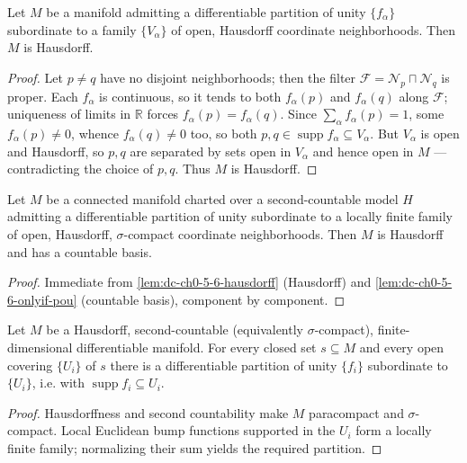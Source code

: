 \begin{lemma}
  \label{lem:dc-ch0-5-6-hausdorff}
  \leanok
  Let $M$ be a manifold admitting a differentiable partition of unity $\{f_\alpha\}$
  subordinate to a family $\{V_\alpha\}$ of open, Hausdorff coordinate neighborhoods. Then
  $M$ is Hausdorff.
\end{lemma}
\begin{proof}
  \sketch
  \leanok
  Let $p\neq q$ have no disjoint neighborhoods; then the filter $\mathcal F=\mathcal N_p
  \sqcap\mathcal N_q$ is proper. Each $f_\alpha$ is continuous, so it tends to both
  $f_\alpha(p)$ and $f_\alpha(q)$ along $\mathcal F$; uniqueness of limits in $\mathbb R$
  forces $f_\alpha(p)=f_\alpha(q)$. Since $\sum_\alpha f_\alpha(p)=1$, some $f_\alpha(p)\neq
  0$, whence $f_\alpha(q)\neq0$ too, so both $p,q\in\operatorname{supp}f_\alpha\subseteq
  V_\alpha$. But $V_\alpha$ is open and Hausdorff, so $p,q$ are separated by sets open in
  $V_\alpha$ and hence open in $M$ — contradicting the choice of $p,q$. Thus $M$ is
  Hausdorff.
\end{proof}

\begin{lemma}
  \label{lem:dc-ch0-5-6-onlyif-complete}
  \leanok
  Let $M$ be a connected manifold charted over a second-countable model $H$ admitting a
  differentiable partition of unity subordinate to a locally finite family of open,
  Hausdorff, $\sigma$-compact coordinate neighborhoods. Then $M$ is Hausdorff and has a
  countable basis.
\end{lemma}
\begin{proof}
  \sketch
  \leanok
  Immediate from \cref{lem:dc-ch0-5-6-hausdorff} (Hausdorff) and
  \cref{lem:dc-ch0-5-6-onlyif-pou} (countable basis), component by component.
\end{proof}

\begin{lemma}
  \label{lem:dc-ch0-5-6-exists}
  \leanok
  Let $M$ be a Hausdorff, second-countable (equivalently $\sigma$-compact),
  finite-dimensional differentiable manifold. For every closed set $s\subseteq M$
  and every open covering $\{U_i\}$ of $s$ there is a differentiable partition of
  unity $\{f_i\}$ subordinate to $\{U_i\}$, i.e. with
  $\operatorname{supp} f_i\subseteq U_i$.
\end{lemma}
\begin{proof}
  \sketch
  \leanok
  Hausdorffness and second countability make $M$ paracompact and $\sigma$-compact.
  Local Euclidean bump functions supported in the $U_i$ form a locally finite family;
  normalizing their sum yields the required partition.
\end{proof}


